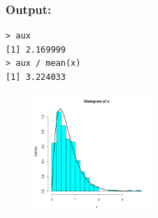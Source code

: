 \documentclass{article}
\begin{document}
    \subsubsection*{Output:}
    \begin{verbatim}
> aux
[1] 2.169999
> aux / mean(x)
[1] 3.224033\end{verbatim}
    \begin{figure}[ht]
        \centering
        \includegraphics[width = 0.4\textwidth]{mmv.png}
    \end{figure}
\end{document}
